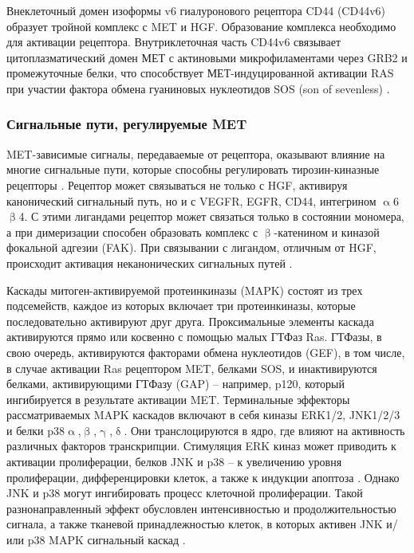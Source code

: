 Внеклеточный домен изоформы v6 гиалуронового рецептора CD44 (CD44v6) образует тройной комплекс с MET и HGF. Образование комплекса необходимо для активации рецептора. Внутриклеточная часть CD44v6 связывает цитоплазматический домен МЕТ с актиновыми микрофиламентами через GRB2 и промежуточные белки, что способствует МЕТ-индуцированной активации RAS при участии фактора обмена гуаниновых нуклеотидов SOS (son of sevenless) \cite{orian-rousseau_hepatocyte_2007}.

\subsubsection{Сигнальные пути, регулируемые MET}

MET-зависимые сигналы, передаваемые от рецептора, оказывают влияние на многие сигнальные пути, которые способны регулировать тирозин-киназные рецепторы \cite{gherardi_targeting_2012}. Рецептор может связываться не только с HGF, активируя канонический сигнальный путь, но и с VEGFR, EGFR, CD44, интегрином $\upalpha$6$\upbeta$4. С этими лигандами рецептор может связаться только в состоянии мономера, а при димеризации способен образовать комплекс с $\upbeta$-катенином и киназой фокальной адгезии (FAK). При связывании с лигандом, отличным от HGF, происходит активация неканонических сигнальных путей \cite{garcia-vilas_updates_2018}.

Каскады митоген-активируемой протеинкиназы (MAPK) состоят из трех подсемейств, каждое из которых включает три протеинкиназы, которые последовательно активируют друг друга. Проксимальные элементы каскада активируются прямо или косвенно с помощью малых ГТФаз Ras. ГТФазы, в свою очередь, активируются факторами обмена нуклеотидов (GEF), в том числе, в случае активации Ras рецептором MET, белками SOS, и инактивируются белками, активирующими ГТФазу (GAP) – например, p120, который ингибируется в результате активации MET. Терминальные эффекторы рассматриваемых MAPK каскадов включают в себя киназы ERK1/2,  JNK1/2/3 и белки p38$\upalpha$,$\upbeta$,$\upgamma$,$\updelta$. Они транслоцируются в ядро, где влияют на активность различных факторов транскрипции. Стимуляция ERK киназ может приводить к активации пролиферации, белков JNK и p38 – к увеличению уровня пролиферации, дифференцировки клеток, а также к индукции апоптоза  \cite{trusolino_met_2010}. Однако JNK и p38 могут ингибировать процесс клеточной пролиферации. Такой разнонаправленный эффект обусловлен интенсивностью и продолжительностью сигнала, а также тканевой принадлежностью клеток, в которых активен JNK и/или p38 MAPK сигнальный каскад \cite{wagner_signal_2009}.

